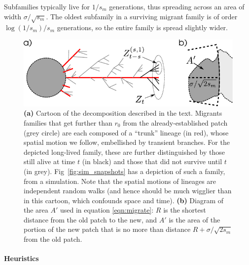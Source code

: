 \documentclass{article}
\newcommand{\revpoint}[2]{}
\renewcommand{\P}{\mathbb{P}}
\begin{document}
Subfamilies typically live for $1/s_m$ generations,
thus spreading across an area of width $\sigma/\sqrt{s_m}$.
The oldest subfamily in a surviving migrant family 
is of order $\log(1/s_m)/s_m$ generations,
so the entire family is spread slightly wider.
\revpoint{2}{2}

\begin{figure}[ht!!]
  \begin{center}
    \includegraphics{branching-concept}
  \end{center}
  \caption{
      \textbf{(a)} 
      Cartoon of the decomposition described in the text. 
    Migrants families that get further than $r_0$ from the already-established patch (grey circle)
    are each composed of a ``trunk'' lineage (in red), whose spatial motion we follow,
    embellished by transient branches.
    For the depicted long-lived family, these are further distinguished by those still alive at time $t$ (in black)
    and those that did not survive until $t$ (in grey).
    Fig~\ref{fig:sim_snapshots} has a depiction of such a family, from a simulation. 
    Note that the spatial motions of lineages are independent random walks
    (and hence should be much wigglier than in this cartoon, which confounds space and time).
      \textbf{(b)} 
      Diagram of the area $A'$ used in equation \eqref{eqn:migrate}:
      $R$ is the shortest distance from the old patch to the new,
      and $A'$ is the area of the portion of the new patch that is no more than distance $R+\sigma/\sqrt{2s_m}$
      from the old patch.
} \label{fig:branching_decomp}
\end{figure}


\paragraph{Heuristics}
\label{ss:heuristics}
\end{document}
